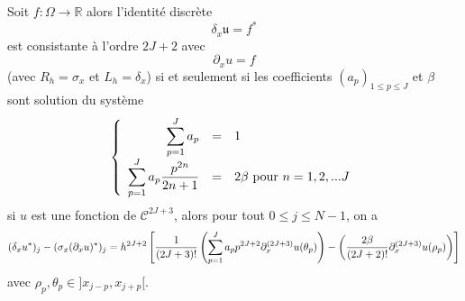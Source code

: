 \begin{theoreme}
Soit $f : \Omega \rightarrow \mathbb{R}$ alors l'identité discrète
\begin{equation}
\delta_{x} \mathfrak{u} = f^*
\end{equation}
est consistante à l'ordre $2J+2$ avec 
\begin{equation}
\partial_x u = f
\end{equation}
(avec $R_h = \sigma_x$ et $L_h = \delta_{x}$) si et seulement si les coefficients $(a_p)_{1 \leq p \leq J}$ et $\beta$ sont solution du système
\begin{equation}
\left\lbrace
\begin{array}{rcl}
\displaystyle\sum\limits_{p=1}^J a_p & = & 1 \\
\displaystyle\sum\limits_{p=1}^J a_p \dfrac{p^{2n}}{2n+1} & = & 2 \beta  \text{ pour } n=1,2,...J
\end{array}
\right.
\label{eq:hermitian_system}
\end{equation}
si $u$ est une fonction de $\mathcal{C}^{2J+3}$, alors pour tout $0 \leq j \leq N-1$, on a 
\begin{equation}
(\delta_{x} u^*)_j - (\sigma_{x} (\partial_x u)^*)_j = h^{2J+2} \left[ \dfrac{1}{(2J+3)!}  \left( \displaystyle\sum\limits_{p=1}^J a_p  p^{2J+2} \partial_x^{(2J+3)}u(\theta_p)\right)  - \left( \dfrac{2\beta}{(2J+2)!}    \partial_x^{(2J+3)}u(\rho_p)\right) \right]
\label{eq:eq_cons}
\end{equation} 
avec $\rho_p, \theta_p \in ]x_{j-p}, x_{j+p}[$.
\label{th:consistance_delta_x_implicite}
\end{theoreme}


